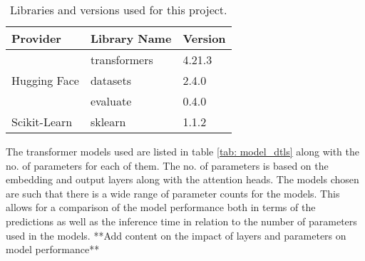 \begin{table}[ht]
    \captionsetup{font=small}
    \centering
    \begin{tabularx}{\textwidth}{|X|X|X|}
        \hline
        \rowcolor[gray]{0.7}
        \multirow{-3}{*}{} \textbf{Provider} & \textbf{Library Name} & \textbf{Version} \\
        \hline
        \multirow{3}{*}{Hugging Face} & transformers & 4.21.3 \\
        \cline{2-3}
        & datasets & 2.4.0 \\
        \cline{2-3}
        & evaluate & 0.4.0 \\
        \hline
        Scikit-Learn & sklearn & 1.1.2 \\
        \hline
    \end{tabularx}
    \caption{Libraries and versions used for this project.}    
    \label{tab: libs_used}
\end{table}

The transformer models used are listed in table \ref{tab: model_dtls} along with the no. of parameters for each of them. The no. of parameters is based on the embedding and output layers along with the attention heads. The models chosen are such that there is a wide range of parameter counts for the models. This allows for a comparison of the model performance both in terms of the predictions as well as the inference time in relation to the number of parameters used in the models. **Add content on the impact of layers and parameters on model performance**


